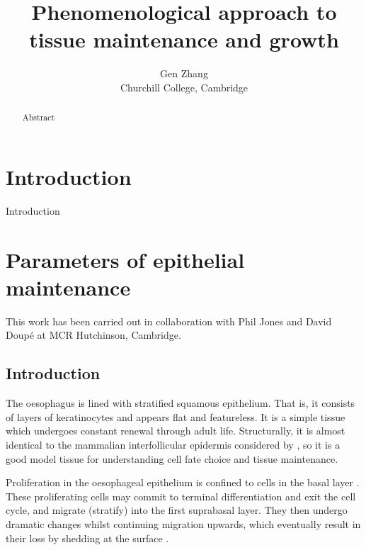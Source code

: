 \documentclass[10pt,english]{report}
\begin{document}
\author{Gen Zhang\\
	Churchill College, Cambridge}
\title{Phenomenological approach to tissue maintenance and growth}

\maketitle



\begin{abstract}
Abstract
\end{abstract}

\tableofcontents

\chapter{Introduction}
\setcounter{page}{1}

Introduction \citet{clayton}

\chapter{Parameters of epithelial maintenance}

This work has been carried out in collaboration with Phil Jones and David Doup\'e at MCR Hutchinson, Cambridge.

\section{Introduction}

The oesophagus is lined with stratified squamous epithelium. That is, it consists of layers of keratinocytes and appears flat and featureless. It is a simple tissue which undergoes constant renewal through adult life. Structurally, it is almost identical to the mammalian interfollicular epidermis considered by \citet{clayton}, so it is a good model tissue for understanding cell fate choice and tissue maintenance.

Proliferation in the oesophageal epithelium is confined to cells in the basal layer \citep{leblond}. These proliferating cells may commit to terminal differentiation and exit the cell cycle, and migrate (stratify) into the first suprabasal layer. They then undergo dramatic changes whilst continuing migration upwards, which eventually result in their loss by shedding at the surface \citep{seery}.
\end{document}
